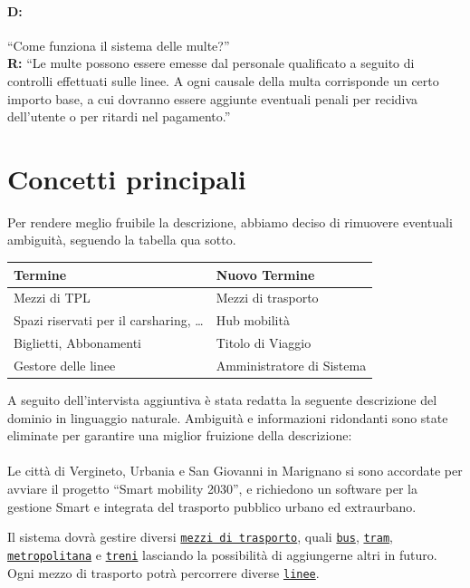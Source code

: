 \documentclass[12pt,a4paper]{report}
\begin{document}
\paragraph{D:}
“Come funziona il sistema delle multe?”
\\ {\bf R:} “Le multe possono essere emesse dal personale qualificato a seguito di controlli effettuati sulle linee.
A ogni causale della multa corrisponde un certo importo base, a cui dovranno essere aggiunte eventuali penali per recidiva dell’utente o per ritardi nel pagamento.”


\section{Concetti principali}
Per rendere meglio fruibile la descrizione, abbiamo deciso di rimuovere eventuali ambiguità, seguendo la tabella qua sotto.

\begin{table}[h!]
\begin{tabular}{|l|l|}
\hline
\textbf{Termine} & \textbf{Nuovo Termine} \\
\hline
Mezzi di TPL & Mezzi di trasporto \\
Spazi riservati per il carsharing, … & Hub mobilità \\
Biglietti, Abbonamenti & Titolo di Viaggio \\
Gestore delle linee & Amministratore di Sistema \\
\hline
\end{tabular}
\end{table}

A seguito dell’intervista aggiuntiva è stata redatta la seguente descrizione del dominio in linguaggio naturale. Ambiguità e informazioni ridondanti sono state eliminate per garantire una miglior fruizione della descrizione:
\\ \\
Le città di Vergineto, Urbania e San Giovanni in Marignano si sono accordate per avviare il progetto “Smart mobility 2030”, e richiedono un software per la gestione Smart e integrata del trasporto pubblico urbano ed extraurbano.

Il sistema dovrà gestire diversi \underline{\texttt{mezzi di trasporto}}, quali \underline{\texttt{bus}}, \underline{\texttt{tram}}, \underline{\texttt{metropolitana}} e \underline{\texttt{treni}} lasciando la possibilità di aggiungerne altri in futuro. Ogni mezzo di trasporto potrà percorrere diverse \underline{\texttt{linee}}.
\end{document}
